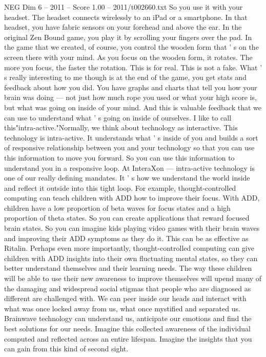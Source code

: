 \begin{textsample}{NEG Dim 6 – 2011 – Score 1.00 – 2011/t002660.txt}
So you use it with your headset.
The headset connects wirelessly to an iPad or a smartphone.
In that headset, you have fabric sensors on your forehead and above the ear.
In the original Zen Bound game, you play it by scrolling your fingers over the pad.
In the game that we created, of course, you control the wooden form that ' s on the screen there with your mind.
As you focus on the wooden form, it rotates.
The more you focus, the faster the rotation.
This is for real.
This is not a fake.
What ' s really interesting to me though is at the end of the game, you get stats and feedback about how you did.
You have graphs and charts that tell you how your brain was doing — not just how much rope you used or what your high score is, but what was going on inside of your mind.
And this is valuable feedback that we can use to understand what ' s going on inside of ourselves.
I like to call this"intra-active."Normally, we think about technology as interactive.
This technology is intra-active.
It understands what ' s inside of you and builds a sort of responsive relationship between you and your technology so that you can use this information to move you forward.
So you can use this information to understand you in a responsive loop.
At InteraXon — intra-active technology is one of our really defining mandates.
It ' s how we understand the world inside and reflect it outside into this tight loop.
For example, thought-controlled computing can teach children with ADD how to improve their focus.
With ADD, children have a low proportion of beta waves for focus states and a high proportion of theta states.
So you can create applications that reward focused brain states.
So you can imagine kids playing video games with their brain waves and improving their ADD symptoms as they do it.
This can be as effective as Ritalin.
Perhaps even more importantly, thought-controlled computing can give children with ADD insights into their own fluctuating mental states, so they can better understand themselves and their learning needs.
The way these children will be able to use their new awareness to improve themselves will upend many of the damaging and widespread social stigmas that people who are diagnosed as different are challenged with.
We can peer inside our heads and interact with what was once locked away from us, what once mystified and separated us.
Brainwave technology can understand us, anticipate our emotions and find the best solutions for our needs.
Imagine this collected awareness of the individual computed and reflected across an entire lifespan.
Imagine the insights that you can gain from this kind of second sight.

\end{textsample}
